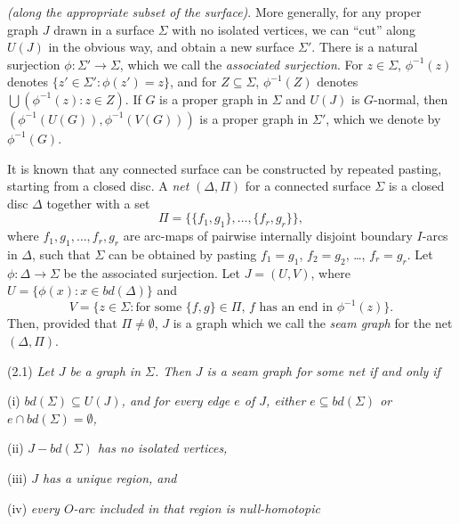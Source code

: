 \textit{(along the appropriate subset of the surface)}. More generally, for any proper graph $J$ drawn in a surface $\Sigma$ with no isolated vertices, we can ``cut'' along $U(J)$ in the obvious way, and obtain a new surface $\Sigma'$. There is a natural surjection $\phi \colon \Sigma' \to \Sigma$, which we call the \textit{associated surjection}. For $z \in \Sigma$, $\phi^{-1}(z)$ denotes $\{z' \in \Sigma' \colon \phi(z') = z\}$, and for $Z \subseteq \Sigma$, $\phi^{-1}(Z)$ denotes $\bigcup (\phi^{-1}(z) \colon z \in Z)$. If $G$ is a proper graph in $\Sigma$ and $U(J)$ is $G$-normal, then $(\phi^{-1}(U(G)), \phi^{-1}(V(G)))$ is a proper graph in $\Sigma'$, which we denote by $\phi^{-1}(G)$.

It is known that any connected surface can be constructed by repeated pasting, starting from a closed disc. A \textit{net} $(\Delta, \Pi)$ for a connected surface $\Sigma$ is a closed disc $\Delta$ together with a set
\begin{equation*}
\Pi = \{\{f_1, g_1\}, \dots, \{f_r, g_r\}\},
\end{equation*}
where $f_1, g_1, \dots, f_r, g_r$ are arc-maps of pairwise internally disjoint boundary $I$-arcs in $\Delta$, such that $\Sigma$ can be obtained by pasting $f_1 = g_1$, $f_2 = g_2$, \dots, $f_r = g_r$. Let $\phi \colon \Delta \to \Sigma$ be the associated surjection. Let $J = (U, V)$, where $U = \{\phi(x) \colon x \in bd(\Delta)\}$ and
\begin{equation*}
V = \{z \in \Sigma \colon \text{for some } \{f, g\} \in \Pi\text{, } f \text{ has an end in } \phi^{-1}(z)\}.
\end{equation*}
Then, provided that $\Pi \ne \emptyset$, $J$ is a graph which we call the \textit{seam graph} for the net $(\Delta, \Pi)$.

\stmt
(2.1) \textit{Let $J$ be a graph in $\Sigma$. Then $J$ is a seam graph for some net if and only if}

\hspace*{12pt}(i) \textit{$bd(\Sigma) \subseteq U(J)$, and for every edge $e$ of $J$, either $e \subseteq bd(\Sigma)$ or $e \cap bd(\Sigma) = \emptyset$,}

\hspace*{12pt}(ii) \textit{$J - bd(\Sigma)$ has no isolated vertices,}

\hspace*{12pt}(iii) \textit{$J$ has a unique region, and}

\hspace*{12pt}(iv) \textit{every $O$-arc included in that region is null-homotopic}


